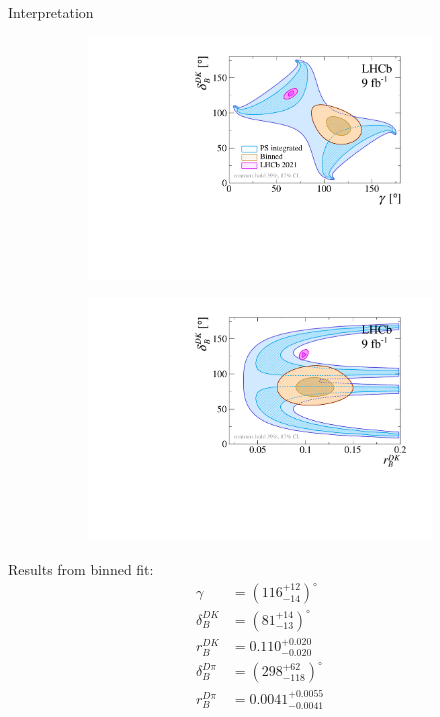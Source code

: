 \documentclass{beamer}
\begin{document}
\begin{frame}{Interpretation}
  \begin{figure}
    \centering
    \begin{subfigure}{0.50\textwidth}
      \includegraphics[width = 1.0\textwidth]{Plots/gammacharm_lhcb_KKpipi_GLW_KKpipi_GGSZ_lhcb_2020_beauty_and_charm_g_d_dk.pdf}
    \end{subfigure}%
    \begin{subfigure}{0.50\textwidth}
      \includegraphics[width = 1.0\textwidth]{Plots/gammacharm_lhcb_KKpipi_GLW_KKpipi_GGSZ_lhcb_2020_beauty_and_charm_r_dk_d_dk.pdf}
    \end{subfigure}
  \end{figure}
  \vspace{-0.35cm}
  Results from binned fit:
  \vspace{-0.2cm}
  \begin{align*}
    \gamma &= (116^{+12}_{-14})^\circ \\
    \delta_B^{DK} &= (81^{+14}_{-13})^\circ \\
    r_B^{DK} &= 0.110^{+0.020}_{-0.020} \\
    \delta_B^{D\pi} &= (298^{+62}_{-118})^\circ \\
    r_B^{D\pi} &= 0.0041^{+0.0055}_{-0.0041}
  \end{align*}
\end{frame}
\end{document}
